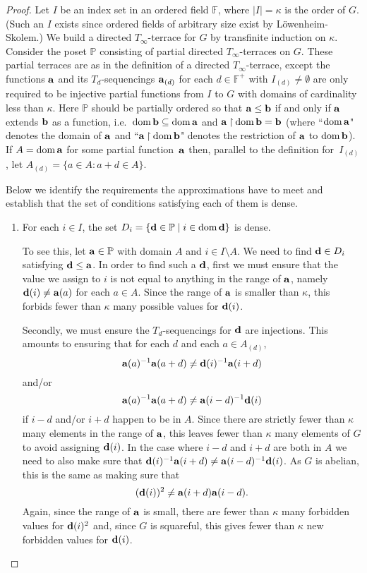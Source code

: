 \documentclass[12pt,a4paper]{article}
\newcommand{\F}{\mathbb{F}}
\DeclareMathOperator{\dom}{dom}
\newcommand{\rest}{\mathbin{\upharpoonright}}
\newcommand{\st}{\; | \;}
\newcommand{\set}[2]{\left\{#1\st #2 \right\}}
\renewcommand{\P}{\mathbb{P}}
\renewcommand{\a}{\textup{\textbf{a}}}
\renewcommand{\b}{\textup{\textbf{b}}}
\renewcommand{\d}{\textup{\textbf{d}}}
\begin{document}
\begin{proof}
Let $I$ be an index set in an ordered field $\F$, where $|I|=\kappa$ is the order of $G$. (Such an $I$ exists since ordered fields of arbitrary size exist by L\"owenheim-Skolem.) We build a directed $T_\infty$-terrace for $G$ by transfinite induction on $\kappa$. Consider the poset $\P$ consisting of partial directed $T_\infty$-terraces on $G$. These partial terraces are as in the definition of a directed $T_\infty$-terrace, except the functions $\a$ and its $T_d$-sequencings $\a_{(d)}$ for each $d \in \F^+$ with $I_{(d)} \neq \emptyset$ are only required to be injective partial functions from $I$ to $G$ with domains of cardinality less than $\kappa$. Here $\P$ should be partially ordered so that $\a \leq \b$ if and only if $\a$ extends $\b$ as a function, i.e.\ $\dom \b \subseteq \dom \a$ and $\a \rest \dom \b = \b$ (where ``$\dom \a$" denotes the domain of ${\bf \a}$ and ``$\a \rest \dom \b$" denotes the restriction of $\a$ to $\dom \b$).  If $A = \dom \a$ for some partial function~$\a$ then, parallel to the definition for~$I_{(d)}$, let $A_{(d)} = \{ a \in A : a+d \in A \}$.

Below we identify the requirements the approximations have to meet and establish that the set of conditions satisfying each of them is dense.

\begin{enumerate}
	\item \label{item:DomainDense} For each $i \in I$, the set $D_i=\set{\d \in \P}{i \in \dom \d }$ is dense. 
	
	To see this, let $\a \in \P$ with domain $A$ and $i \in I \setminus A$. We need to find $\d \in D_i$ satisfying $\d \leq \a$. In order to find such a $\d$, first we must ensure that the value we assign to $i$ is not equal to anything in the range of $\a$, namely $\d(i) \neq \a(a)$ for each $a \in A$.
	Since the range of \(\a\) is smaller than \(\kappa\), this forbids fewer than \(\kappa\) many possible values for \(\d(i)\).
	
	Secondly, we must ensure the $T_d$-sequencings for $\d$ are injections. This amounts to ensuring that for each \(d\) and each $a \in A_{(d)}$, 
		$$\a(a)^{-1}\a(a+d) \neq \d(i)^{-1}\a(i+d)$$ and/or
		$$\a(a)^{-1}\a(a+d) \neq \a(i-d)^{-1}\d(i)$$ if $i-d$ and/or $i+d$ happen to be in $A$. Since there are strictly fewer than $\kappa$ many elements in the range of $\a$, this leaves fewer than $\kappa$ many elements of $G$ to avoid assigning $\d(i)$.
	In the case where $i-d$ and $i+d$ are both in $A$ we need to also make sure that $\d(i)^{-1}\a(i+d) \neq \a(i-d)^{-1}\d(i)$. As $G$ is abelian, this is the same as making sure that $$(\d(i))^2 \neq \a(i+d)\a(i-d).$$
	Again, since the range of $\a$ is small, there are fewer than $\kappa$ many forbidden
	values for $\d(i)^2$ and, since $G$ is squareful, this gives fewer than $\kappa$ new
	forbidden values for $\d(i)$.
	

\end{enumerate}
\end{proof}
\end{document}
